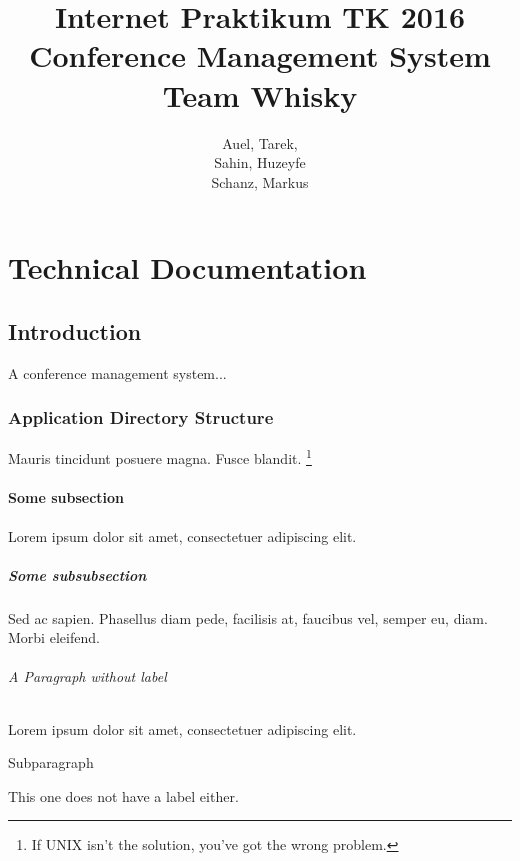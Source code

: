 \documentclass[nochapterpage,nopartpage,numbersubsubsec,bigchapter,colorback,accentcolor=tud9c]{tudreport}
\title{Internet Praktikum TK 2016\\ Conference Management System\\ Team Whisky}
\subtitle{Auel, Tarek,\\ Sahin, Huzeyfe\\ Schanz, Markus}
\begin{document}
\maketitle
\tableofcontents
\listoffigures
{}




\part{Technical Documentation}
\label{part:tech}

  \chapter{Introduction}
  \label{ch:tech:intro}

    A conference management system...

  \section{Application Directory Structure}
  \label{sec:tech:intro:dirs}

    Mauris tincidunt posuere magna. Fusce blandit.%
    \footnote{If UNIX isn't the solution, you've got the wrong problem.}

  \subsection{Some subsection}
  \label{sec:tech:intro:dirs:subsection}

    Lorem ipsum dolor sit amet, consectetuer adipiscing elit.

  \subsubsection{Some subsubsection}
  \label{sec:tech:intro:dirs:subsection:subsubsection}

    Sed ac sapien. Phasellus diam pede, facilisis at, faucibus vel, semper eu, diam. Morbi eleifend.

  \paragraph{A Paragraph without label}

    Lorem ipsum dolor sit amet, consectetuer adipiscing elit.

  \subparagraph{Subparagraph}

    This one does not have a label either.
\end{document}
